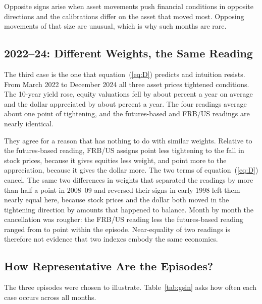 \documentclass[11pt]{article}
\begin{document}


Opposite signs arise when asset movements push financial conditions in opposite directions and the calibrations differ on the asset that moved most. Opposing movements of that size are unusual, which is why such months are rare.

\subsection{2022--24: Different Weights, the Same Reading}\label{sec:recent}
The third case is the one that equation~(\ref{eq:D}) predicts and intuition resists. From March 2022 to December 2024 all three asset prices tightened conditions. The 10-year yield rose, equity valuations fell by about  percent a year on average and the dollar appreciated by about  percent a year. The four readings average about one point of tightening, and the futures-based and FRB/US readings are nearly identical.

They agree for a reason that has nothing to do with similar weights. Relative to the futures-based reading, FRB/US assigns  point less tightening to the fall in stock prices, because it gives equities less weight, and  point more to the appreciation, because it gives the dollar more. The two terms of equation~(\ref{eq:D}) cancel. The same two differences in weights that separated the readings by more than half a point in 2008--09 and reversed their signs in early 1998 left them nearly equal here, because stock prices and the dollar both moved in the tightening direction by amounts that happened to balance. Month by month the cancellation was rougher: the FRB/US reading less the futures-based reading ranged from  to  point within the episode. Near-equality of two readings is therefore not evidence that two indexes embody the same economics.

\subsection{How Representative Are the Episodes?}\label{sec:fullhist}
The three episodes were chosen to illustrate. Table~\ref{tab:gsin} asks how often each case occurs across all  months.


\end{document}
